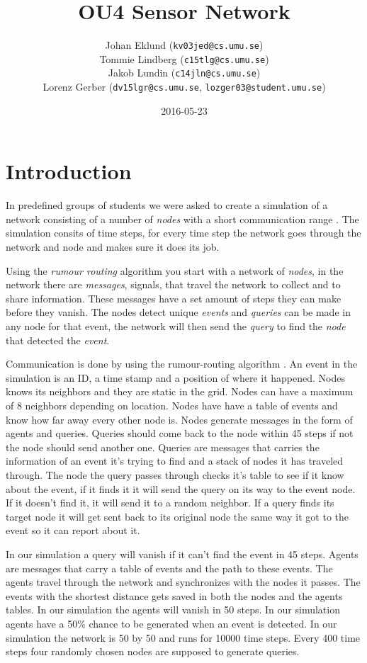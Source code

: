 \documentclass[a4paper,11pt,twoside]{article}
\title{OU4 Sensor Network}
\author{Johan Eklund ({\tt{kv03jed@cs.umu.se}}) \\ 
Tommie Lindberg ({\tt{c15tlg@cs.umu.se}}) \\
Jakob Lundin ({\tt{c14jln@cs.umu.se}}) \\
Lorenz Gerber ({\tt{dv15lgr@cs.umu.se}}, {\tt{lozger03@student.umu.se}})
}
\date{2016-05-23}
\begin{document}
\lstset{language=C}
\maketitle
\thispagestyle{empty}
\newpage
\tableofcontents
\thispagestyle{empty}
\newpage

\clearpage
{}

\section{Introduction}
In predefined groups of students we were asked to create a simulation
of a network consisting of a number of \textit{nodes} with a short
communication range \cite{sensornetwork}. The simulation consits of
time steps, for every time step the network goes through the network
and node and makes sure it does its job.

Using the \textit{rumour routing} algorithm \cite{braginsky2002} you
start with a network of \textit{nodes}, in the  network there are
\textit{messages}, signals, that travel the network to
collect and to share information. These messages have a set amount of
steps they can make before they vanish. The nodes detect unique
\textit{events} and \textit{queries} can be made in any node for that
event, the network will then send the \textit{query} to find the
\textit{node} that detected the \textit{event}.

Communication is done by using the rumour-routing algorithm
\cite{braginsky2002}. An event in the simulation is an ID, a time
stamp and a  position of where it happened. Nodes knows its neighbors
and they are static in the grid. Nodes can have a maximum of 8
neighbors depending on location. Nodes have have a table of events and
know how far away every other node is. Nodes generate messages in the
form of agents and queries. Queries should come back to the node
within 45 steps if not the node should send another one. Queries are
messages that carries the information of an event it's trying to find
and a stack of nodes it has traveled through. The node the query
passes through checks it's table to see if it know about the event, if
it finds it it will send the query on its way to the event node. If it
doesn't find it, it will send it to a random neighbor. If a query
finds its target node it will get sent back to its original node the
same way it got to the event so it can report about it.

In our simulation a query will vanish if it can't find the event in 45
steps. Agents are messages that carry a table of events and the path
to these events. The agents travel through the network and
synchronizes with the nodes it passes. The events with the shortest
distance gets saved in both the nodes and the agents tables. In our
simulation the agents will vanish in 50 steps. In our simulation
agents have a 50\% chance to be generated when an event is
detected. In our simulation the network is 50 by 50 and runs for
10000 time steps. Every 400 time steps four randomly chosen nodes are
supposed to generate queries.
\end{document}
